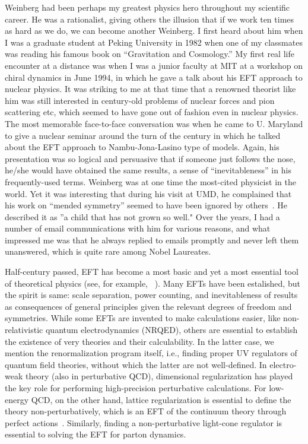 \documentclass[prd,aps,twocolumn,preprintnumbers,showpacs,nofootinbib,superscriptaddress,notitlepage]{revtex4-1}
\begin{document}
Weinberg had been perhaps my greatest physics hero throughout my scientific career. He was a rationalist, giving others the illusion that if we work ten times as hard as we do, we can become another Weinberg. I first heard about him when I was a graduate student at Peking University in 1982 when one of my classmates was reading his famous book on ``Gravitation and Cosmology.'' My first real life encounter at a distance was when I was a junior faculty at MIT at a workshop on chiral dynamics in June 1994, in which he gave a talk about his EFT approach to nuclear physics. It was striking to me at that time that a renowned theorist like him was still interested in century-old problems of nuclear forces and pion scattering etc, which seemed to have gone out of fashion even in nuclear physics. The most memorable face-to-face conversation was when he came to U. Maryland to give a nuclear seminar around the turn of the century in which he talked about the EFT approach to Nambu-Jona-Lasino type of models. Again, his presentation was so logical and persuasive that if someone just follows the nose, he/she would have obtained the same results, a sense of ``inevitableness'' in his frequently-used terms. Weinberg was at one time the most-cited physicist in the world. Yet it was interesting that during his visit at UMD, he complained that his work on ``mended symmetry'' seemed to have been ignored by others~\cite{Weinberg:1990xn}. He described it as ''a child that has not grown so well." Over the years, I had a number of email communications with him for various reasons, and what impressed me was that he always replied to emails promptly and never left them unanswered, which is quite rare among Nobel Laureates.

Half-century passed, EFT has become a most basic and yet a most essential tool of theoretical physics (see, for example, ~\cite{Georgi:1993mps,Manohar:2018aog}).
Many EFTs have been estalished, but the spirit is same: scale separation, power counting, and 
inevitableness of results as consequences of general principles given the relevant degrees of 
freedom and symmetries. While some EFTs are invented to make calculations easier, like non-relativistic quantum electrodynamics (NRQED), others are essential to establish the existence of very theories and their calculability.  In the latter case, we mention the renormalization program itself, i.e., finding proper UV regulators of quantum field theories, without which the latter are not well-defined. 
In electro-weak theory (also in perturbative QCD), dimensional regularization has played the key role for performing high-precision perturbative calculations. For low-energy QCD, on the other hand, lattice regularization is essential to define the theory non-perturbatively, which is an EFT of the continuum theory through perfect actions~\cite{Symanzik:1983dc,Symanzik:1983gh}. Similarly, finding a non-perturbative light-cone regulator is essential to solving the EFT for
parton dynamics.
\end{document}
